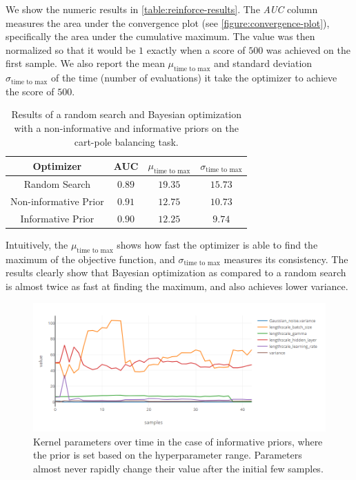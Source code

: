 We show the numeric results in \autoref{table:reinforce-results}. The \emph{AUC} column measures the area under the convergence plot (see \autoref{figure:convergence-plot}), specifically the area under the cumulative maximum. The value was then normalized so that it would be $1$ exactly when a score of $500$ was achieved on the first sample. We also report the mean $\mu_{\text{time to max}}$ and standard deviation $\sigma_{\text{time to max}}$ of the time (number of evaluations) it take the optimizer to achieve the score of $500$.

\begin{table}[t]
	\begin{center}
		\begin{tabular}{||c c c c||} 
			\hline
			Optimizer & AUC & $\mu_{\text{time to max}}$ & $\sigma_{\text{time to max}}$ \\ [0.5ex] 
			\hline\hline
			Random Search & $0.89$ & $19.35$ & $15.73$ \\ 
			\hline
			Non-informative Prior & $0.91$ & $12.75$ & $10.73$ \\
			\hline
			Informative Prior & $0.90$ & $12.25$ & $9.74$  \\
			\hline
		\end{tabular}
		\caption{Results of a random search and Bayesian optimization with a non-informative and informative priors on the cart-pole balancing task.}
		\label{table:reinforce-results}
	\end{center}
\end{table}

Intuitively, the $\mu_{\text{time to max}}$ shows how fast the optimizer is able to find the maximum of the objective function, and $\sigma_{\text{time to max}}$ measures its consistency. The results clearly show that Bayesian optimization as compared to a random search is almost twice as fast at finding the maximum, and also achieves lower variance.

\begin{figure}
	\begin{center}
		\includegraphics[width=1.0\textwidth]{images/informative-priors.png}
		\caption{Kernel parameters over time in the case of informative priors, where the prior is set based on the hyperparameter range. Parameters almost never rapidly change their value after the initial few samples.}
		\label{figure:informative-priors}
	\end{center}
\end{figure}

